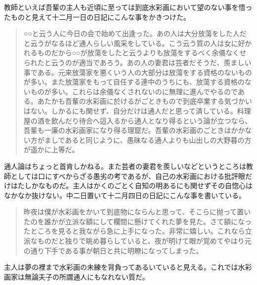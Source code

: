 \documentclass[12pt, openright]{book}
\begin{document}
教師といえば吾輩の主人も近頃に至っては到底水彩画において望のない事を悟ったものと見えて十二月一日の日記にこんな事をかきつけた。

\blockquote{○○と云う人に今日の会で始めて出逢った。あの人は大分放蕩をした人だと云うがなるほど通人らしい風采をしている。こう云う質の人は女に好かれるものだから○○が放蕩をしたと云うよりも放蕩をするべく余儀なくせられたと云うのが適当であろう。あの人の妻君は芸者だそうだ、羨ましい事である。元来放蕩家を悪くいう人の大部分は放蕩をする資格のないものが多い。また放蕩家をもって自任する連中のうちにも、放蕩する資格のないものが多い。これらは余儀なくされないのに無理に進んでやるのである。あたかも吾輩の水彩画に於けるがごときもので到底卒業する気づかいはない。しかるにも関せず、自分だけは通人だと思って済している。料理屋の酒を飲んだり待合へ這入るから通人となり得るという論が立つなら、吾輩も一廉の水彩画家になり得る理窟だ。吾輩の水彩画のごときはかかない方がましであると同じように、愚昧なる通人よりも山出しの大野暮の方が遥かに上等だ。}

通人論はちょっと首肯しかねる。また芸者の妻君を羨しいなどというところは教師としては口にすべからざる愚劣の考であるが、自己の水彩画における批評眼だけはたしかなものだ。主人はかくのごとく自知の明あるにも関せずその自惚心はなかなか抜けない。中二日置いて十二月四日の日記にこんな事を書いている。

\blockquote{昨夜は僕が水彩画をかいて到底物にならんと思って、そこらに抛って置いたのを誰かが立派な額にして欄間に懸けてくれた夢を見た。さて額になったところを見ると我ながら急に上手になった。非常に嬉しい。これなら立派なものだと独りで眺め暮らしていると、夜が明けて眼が覚めてやはり元の通り下手である事が朝日と共に明瞭になってしまった。}

主人は夢の裡まで水彩画の未練を背負ってあるいていると見える。これでは水彩画家は無論夫子の所謂通人にもなれない質だ。
\end{document}
